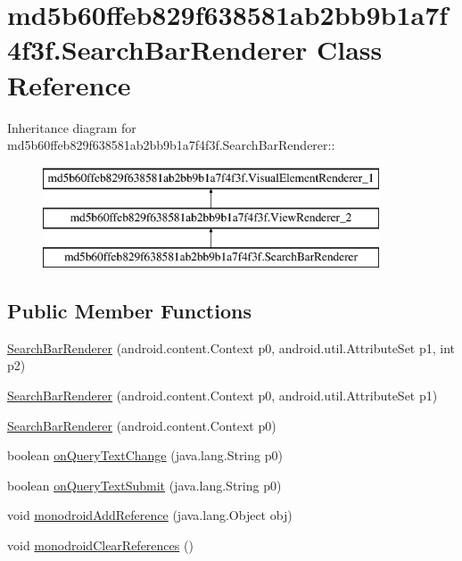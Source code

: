 \hypertarget{classmd5b60ffeb829f638581ab2bb9b1a7f4f3f_1_1_search_bar_renderer}{
\section{md5b60ffeb829f638581ab2bb9b1a7f4f3f.SearchBarRenderer Class Reference}
\label{classmd5b60ffeb829f638581ab2bb9b1a7f4f3f_1_1_search_bar_renderer}
}
Inheritance diagram for md5b60ffeb829f638581ab2bb9b1a7f4f3f.SearchBarRenderer::\begin{figure}[H]
\begin{center}
\leavevmode
\includegraphics[height=3cm]{classmd5b60ffeb829f638581ab2bb9b1a7f4f3f_1_1_search_bar_renderer}
\end{center}
\end{figure}
\subsection*{Public Member Functions}
\begin{CompactItemize}
\item 
\hyperlink{classmd5b60ffeb829f638581ab2bb9b1a7f4f3f_1_1_search_bar_renderer_0c52f1938dc18326653f3a5413d92428}{SearchBarRenderer} (android.content.Context p0, android.util.AttributeSet p1, int p2)
\item 
\hyperlink{classmd5b60ffeb829f638581ab2bb9b1a7f4f3f_1_1_search_bar_renderer_878e0ca2cd8969a1c594bb1dae952c3a}{SearchBarRenderer} (android.content.Context p0, android.util.AttributeSet p1)
\item 
\hyperlink{classmd5b60ffeb829f638581ab2bb9b1a7f4f3f_1_1_search_bar_renderer_7c99ebcffaa2c273a4adbc8e4fc8281a}{SearchBarRenderer} (android.content.Context p0)
\item 
boolean \hyperlink{classmd5b60ffeb829f638581ab2bb9b1a7f4f3f_1_1_search_bar_renderer_53f7d71599559efcc390efdec95a3527}{onQueryTextChange} (java.lang.String p0)
\item 
boolean \hyperlink{classmd5b60ffeb829f638581ab2bb9b1a7f4f3f_1_1_search_bar_renderer_69d8a7b933f0c7ac02d7d945868f8037}{onQueryTextSubmit} (java.lang.String p0)
\item 
void \hyperlink{classmd5b60ffeb829f638581ab2bb9b1a7f4f3f_1_1_search_bar_renderer_9b7a0243add9b3f0e1e1e2e9883f69c6}{monodroidAddReference} (java.lang.Object obj)
\item 
void \hyperlink{classmd5b60ffeb829f638581ab2bb9b1a7f4f3f_1_1_search_bar_renderer_3c10c17f8a9cdc8b84310d45c845399a}{monodroidClearReferences} ()
\end{CompactItemize}
